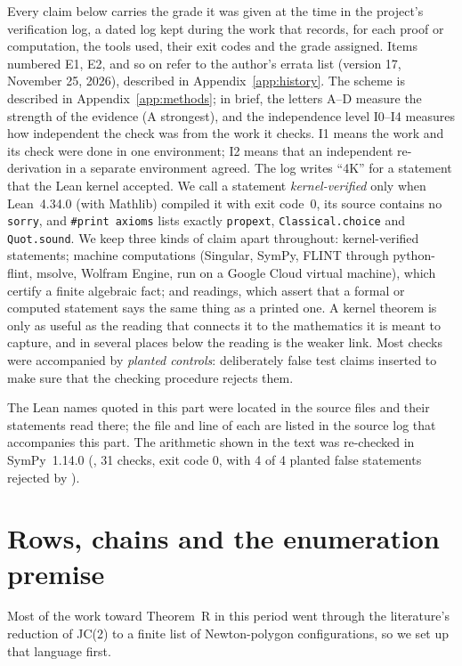 \documentclass[a4paper,11pt]{article}
\newcommand{\filename}[1]{\texttt{\seqsplit{#1}}}
\theoremstyle{jsplain}
\theoremstyle{jsdef}
\theoremstyle{jsrem}
\begin{document}
Every claim below carries the grade it was given at the time in the project's verification log, a dated log kept during the work that records, for each proof or computation, the tools used, their exit codes and the grade assigned. Items numbered E1, E2, and so on refer to the author's errata list (version 17, November 25, 2026), described in Appendix~\ref{app:history}. The scheme is described in Appendix~\ref{app:methods}; in brief, the letters A--D measure the strength of the evidence (A strongest), and the independence level I0--I4 measures how independent the check was from the work it checks. I1 means the work and its check were done in one environment; I2 means that an independent re-derivation in a separate environment agreed. The log writes ``4K'' for a statement that the Lean kernel accepted. We call a statement \emph{kernel-verified} only when Lean~4.34.0 (with Mathlib) compiled it with exit code~$0$, its source contains no \texttt{sorry}, and \texttt{\#print axioms} lists exactly \texttt{propext}, \texttt{Classical.\allowbreak{}choice} and \texttt{Quot.\allowbreak{}sound}. We keep three kinds of claim apart throughout: kernel-verified statements; machine computations (Singular, SymPy, FLINT through python-flint, msolve, Wolfram Engine, run on a Google Cloud virtual machine), which certify a finite algebraic fact; and readings, which assert that a formal or computed statement says the same thing as a printed one. A kernel theorem is only as useful as the reading that connects it to the mathematics it is meant to capture, and in several places below the reading is the weaker link. Most checks were accompanied by \emph{planted controls}: deliberately false test claims inserted to make sure that the checking procedure rejects them.

The Lean names quoted in this part were located in the source files and their statements read there; the file and line of each are listed in the source log that accompanies this part. The arithmetic shown in the text was re-checked in SymPy~1.14.0 (\filename{notes/checks\_part4/part4\_checks.py}, 31 checks, exit code $0$, with 4 of 4 planted false statements rejected by \filename{part4\_plants.py}).

\section{Rows, chains and the enumeration premise}\label{rp:sec:rows}

Most of the work toward Theorem~R in this period went through the literature's reduction of JC(2) to a finite list of Newton-polygon configurations, so we set up that language first.
\end{document}
